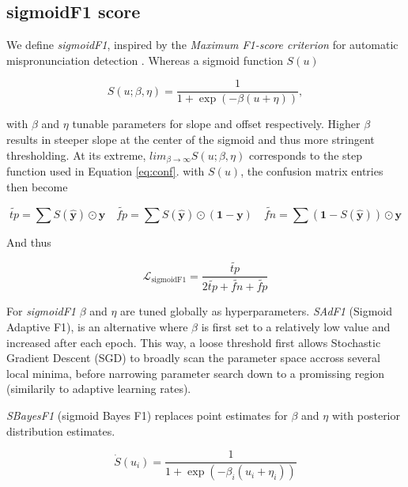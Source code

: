 \subsection{sigmoidF1 score}
\label{sec:orgc5d29d7}

We define \emph{sigmoidF1}, inspired by the \emph{Maximum F1-score criterion} for automatic mispronunciation detection \cite{sigmoid}. Whereas a sigmoid function \(S(u)\)

\begin{equation}
S(u; \beta, \eta)=\frac{1}{1+\exp (-\beta (u + \eta))},
\end{equation}

with \(\beta\) and \(\eta\) tunable parameters for slope and offset respectively. Higher \(\beta\) results in steeper slope at the center of the sigmoid and thus more stringent thresholding. At its extreme, \(lim_{\beta\to\infty} S(u; \beta, \eta)\) corresponds to the step function used in Equation \ref{eq:conf}. with \(S(u)\), the confusion matrix entries then become

\begin{equation}\label{eq:sigmoidF1}
\widetilde{tp}=\sum S(\hat{\mathbf{y}}) \odot \mathbf{y} \quad\widetilde{fp}= \sum S(\hat{\mathbf{y}}) \odot (\mathbf{1} - \mathbf{y}) \quad \widetilde{f n}= \sum (\mathbf{1} - S(\hat{\mathbf{y}})) \odot \mathbf{y}
\end{equation}

And thus

\begin{equation}
\mathcal{L}_{\text {sigmoidF1}}= \frac{\widetilde{tp}}{2 \widetilde{tp}+ \widetilde{fn}+ \widetilde{fp}}
\end{equation}

 \cite{smoothHinge}

For \emph{sigmoidF1} \(\beta\) and \(\eta\) are tuned globally as hyperparameters. \emph{SAdF1} (Sigmoid Adaptive F1), is an alternative where \(\beta\) is first set to a relatively low value and increased after each epoch. This way, a loose threshold first allows Stochastic Gradient Descent (SGD) to broadly scan the parameter space accross several local minima, before narrowing parameter search down to a promissing region (similarily to adaptive learning rates).

\emph{SBayesF1} (sigmoid Bayes F1) replaces point estimates for \(\beta\) and \(\eta\) with posterior distribution estimates. 

\begin{equation}
\dot{S}(u_i) = \frac{1}{1+\exp (-\beta_i (u_i + \eta_i))}
\end{equation}

